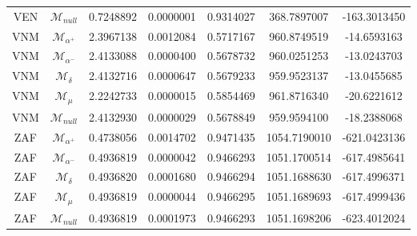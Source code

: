 \begin{tabular}{ccccccc}
VEN & $\mathcal{M}_{null}$ & 0.7248892 & 0.0000001 & 0.9314027 & 368.7897007 & -163.3013450\\
VNM & $\mathcal{M}_{\alpha^+}$ & 2.3967138 & 0.0012084 & 0.5717167 & 960.8749519 & -14.6593163\\
VNM & $\mathcal{M}_{\alpha^-}$ & 2.4133088 & 0.0000400 & 0.5678732 & 960.0251253 & -13.0243703\\
VNM & $\mathcal{M}_{\delta}$ & 2.4132716 & 0.0000647 & 0.5679233 & 959.9523137 & -13.0455685\\
VNM & $\mathcal{M}_{\mu}$ & 2.2242733 & 0.0000015 & 0.5854469 & 961.8716340 & -20.6221612\\
VNM & $\mathcal{M}_{null}$ & 2.4132930 & 0.0000029 & 0.5678849 & 959.9594100 & -18.2388068\\
ZAF & $\mathcal{M}_{\alpha^+}$ & 0.4738056 & 0.0014702 & 0.9471435 & 1054.7190010 & -621.0423136\\
ZAF & $\mathcal{M}_{\alpha^-}$ & 0.4936819 & 0.0000042 & 0.9466293 & 1051.1700514 & -617.4985641\\
ZAF & $\mathcal{M}_{\delta}$ & 0.4936820 & 0.0001680 & 0.9466294 & 1051.1688630 & -617.4996371\\
ZAF & $\mathcal{M}_{\mu}$ & 0.4936819 & 0.0000044 & 0.9466295 & 1051.1689693 & -617.4999436\\
ZAF & $\mathcal{M}_{null}$ & 0.4936819 & 0.0001973 & 0.9466293 & 1051.1698206 & -623.4012024\\
\end{tabular}
